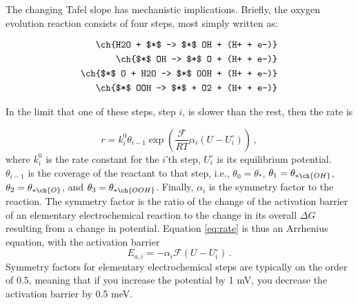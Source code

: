 The changing Tafel slope has mechanistic implications\cite{Shinagawa2015}. Briefly, the oxygen evolution reaction consists of four steps, most simply written as\cite{Man2011, Busch2016}:

\begin{align}
\ch{H2O + $*$ -> $*$ OH + (H+ + e-)}\label{rxn:OER_s1}\\
\ch{$*$ OH -> $*$ O + (H+ + e-)}\label{rxn:OER_s2}\\
\ch{$*$ O + H2O -> $*$ OOH + (H+ + e-)}\label{rxn:OER_s3}\\
\ch{$*$ OOH -> $*$ + O2 + (H+ + e-)}\label{rxn:OER_s4}
\end{align}

In the limit that one of these steps, step $i$, is slower than the rest, then the rate is

\begin{equation}
r = k^0_i\theta_{i-1}\exp\left(\frac{\mathcal{F}}{RT}\alpha_i(U-U^\circ_i)\right)\,,\label{eq:rate}
\end{equation}
where $k^0_i$ is the rate constant for the $i$'th step, $U^\circ_i$ is its equilibrium potential. $\theta_{i-1}$ is the coverage of the reactant to that step, i.e., $\theta_0 = \theta_{*}$, $\theta_1 = \theta_{* \ch{OH}}$, $\theta_2 = \theta_{* \ch{O}}$, and $\theta_3 = \theta_{* \ch{OOH}}$. Finally, $\alpha_i$ is the symmetry factor to the reaction. The symmetry factor is the ratio of the change of the activation barrier of an elementary electrochemical reaction to the change in its overall $\Delta G$ resulting from a change in potential\cite{Bard2001}. Equation \ref{eq:rate} is thus an Arrhenius equation, with the activation barrier
\begin{equation}
E_{a,i} = - \alpha_i\mathcal{F}(U - U^\circ_i)\,.
\end{equation}
Symmetry factors for elementary electrochemical steps are typically on the order of 0.5, meaning that if you increase the potential by 1 mV, you decrease the activation barrier by 0.5 meV.

